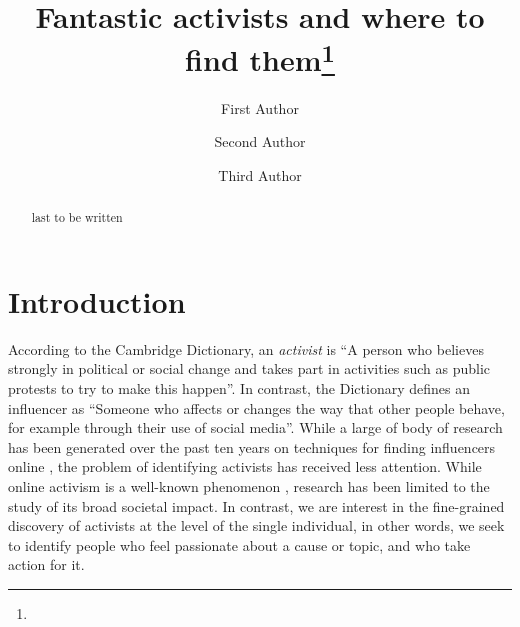\documentclass[runningheads]{llncs}
\begin{document}
%
\title{Fantastic activists and where to find them\thanks{}}
%
%
\author{First Author \and
Second Author \and
Third Author}
%
%
%
\maketitle              %
%
\begin{abstract}
last to be written
\end{abstract}
%


%
%
\section{Introduction}


According to the Cambridge Dictionary, an \textit{activist} is  ``A person who believes strongly in political or social change and takes part in activities such as public protests to try to make this happen''.
In contrast, the Dictionary defines an influencer as ``Someone who affects or changes the way that other people behave, for example through their use of social media''.
%
While a large of body of research has been generated over the past ten years on techniques for finding influencers online \cite{INFLUENCERS}, the problem of identifying activists has received less attention. 
While online activism is a well-known phenomenon \cite{ARAB SPRING papers}, research has been limited to the study of its broad societal impact. 
In contrast, we are interest in the fine-grained discovery of activists at the level of the single individual, in other words, we seek to identify people who feel passionate about a cause or topic, and who take action for it.
\end{document}
